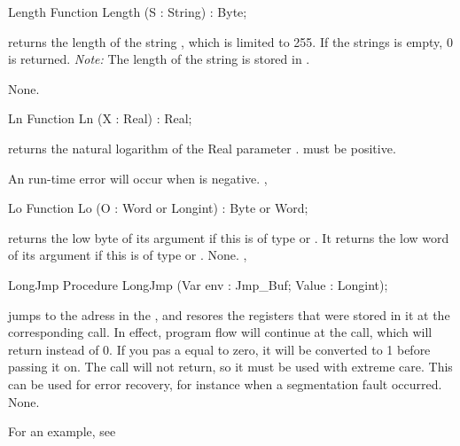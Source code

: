\documentclass{report}
\begin{document}
\html{}
\begin{function}{Length}
\Declaration
Function Length (S : String) : Byte;

\Description
{} returns the length of the string ,
which is limited to 255. If the strings  is empty, 0 is returned.
{\em Note:} The length of the string  is stored in .

\Errors
None.
\SeeAlso
{}
\end{function}
\html{}
\begin{function}{Ln}
\Declaration
Function Ln (X : Real) : Real;

\Description

 returns the natural logarithm of the Real parameter .
 must be positive.

\Errors
An run-time error will occur when  is negative.
\SeeAlso
{}, 
\end{function}
\html{}
\begin{function}{Lo}
\Declaration
Function Lo (O : Word or Longint) : Byte or Word;

\Description
{} returns the low byte of its argument if this is of type
 or
. It returns the low word of its argument if this is of type 
 or .
\Errors
None.
\SeeAlso
{}, 
\end{function}
\html{}
\begin{procedure}{LongJmp}
\Declaration
Procedure LongJmp (Var env : Jmp\_Buf; Value : Longint);

\Description

 jumps to the adress in the  ,
and resores the registers that were stored in it at the corresponding
 call.
In effect, program flow will continue at the  call, which will
return  instead of 0. If you pas a  equal to zero, it will be
converted to 1 before passing it on. The call will not return, so it must be 
used with extreme care.
This can be used for error recovery, for instance when a segmentation fault
occurred.
\Errors
None.
\SeeAlso
{}
\end{procedure}
For an example, see 
\end{document}
